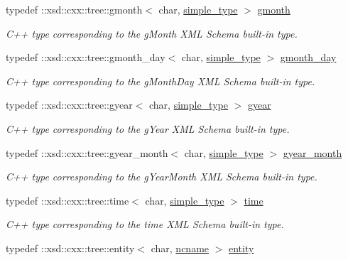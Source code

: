 \begin{DoxyCompactItemize}
typedef \+::xsd\+::cxx\+::tree\+::gmonth$<$ char, \hyperlink{namespacexml__schema_a44789bb4367951bcf8ae867cb983324d}{simple\+\_\+type} $>$ \hyperlink{namespacexml__schema_a1ab06e26cf2c2f3ad971f63c143afd7f}{gmonth}
\begin{DoxyCompactList}\small\item\em C++ type corresponding to the g\+Month X\+M\+L Schema built-\/in type. \end{DoxyCompactList}\item 
typedef \+::xsd\+::cxx\+::tree\+::gmonth\+\_\+day$<$ char, \hyperlink{namespacexml__schema_a44789bb4367951bcf8ae867cb983324d}{simple\+\_\+type} $>$ \hyperlink{namespacexml__schema_aa97adeeeffe50dd9b596b12006c56953}{gmonth\+\_\+day}
\begin{DoxyCompactList}\small\item\em C++ type corresponding to the g\+Month\+Day X\+M\+L Schema built-\/in type. \end{DoxyCompactList}\item 
typedef \+::xsd\+::cxx\+::tree\+::gyear$<$ char, \hyperlink{namespacexml__schema_a44789bb4367951bcf8ae867cb983324d}{simple\+\_\+type} $>$ \hyperlink{namespacexml__schema_ab0d28a4409143544c8f43bbcc1edeac2}{gyear}
\begin{DoxyCompactList}\small\item\em C++ type corresponding to the g\+Year X\+M\+L Schema built-\/in type. \end{DoxyCompactList}\item 
typedef \+::xsd\+::cxx\+::tree\+::gyear\+\_\+month$<$ char, \hyperlink{namespacexml__schema_a44789bb4367951bcf8ae867cb983324d}{simple\+\_\+type} $>$ \hyperlink{namespacexml__schema_acedc1f185fe9175cad53266824897573}{gyear\+\_\+month}
\begin{DoxyCompactList}\small\item\em C++ type corresponding to the g\+Year\+Month X\+M\+L Schema built-\/in type. \end{DoxyCompactList}\item 
typedef \+::xsd\+::cxx\+::tree\+::time$<$ char, \hyperlink{namespacexml__schema_a44789bb4367951bcf8ae867cb983324d}{simple\+\_\+type} $>$ \hyperlink{namespacexml__schema_a75a88454d26d1fbbe712e22e9e994cee}{time}
\begin{DoxyCompactList}\small\item\em C++ type corresponding to the time X\+M\+L Schema built-\/in type. \end{DoxyCompactList}\item 
typedef \+::xsd\+::cxx\+::tree\+::entity$<$ char, \hyperlink{namespacexml__schema_a926a5ddb21b27435d0206310d8fc67b7}{ncname} $>$ \hyperlink{namespacexml__schema_a871d3ae7ead81c6fc7ff7d37cd5f4c8f}{entity}

\end{DoxyCompactItemize}
